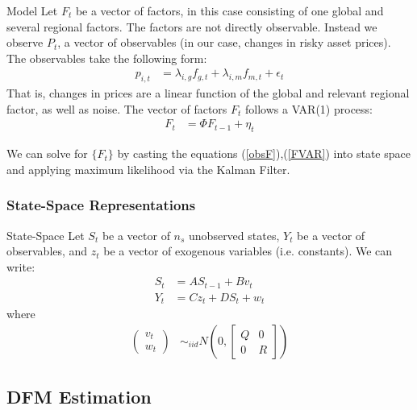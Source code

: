 \documentclass{beamer}
\begin{document}
\iffalse
\begin{frame}{Model}
Let $F_t$ be a vector of factors, in this case consisting of one global and several regional factors. The factors are not directly observable. Instead we observe $P_t$, a vector of observables (in our case, changes in risky asset prices). The observables take the following form:
\begin{align}
p_{i,t} &= \lambda_{i,g} f_{g,t} + \lambda_{i,m} f_{m,t} + \epsilon_t \label{obsF}
\end{align}
That is, changes in prices are a linear function of the global and relevant regional factor, as well as noise. The vector of factors $F_t$ follows a VAR(1) process:
\begin{align}
F_t &= \Phi F_{t-1} + \eta_t \label{FVAR}
\end{align}

We can solve for $\{F_t\}$ by casting the equations (\ref{obsF}),(\ref{FVAR}) into state space and applying maximum likelihood via the Kalman Filter.
\end{frame}
\subsubsection*{State-Space Representations}
\begin{frame}{State-Space}
Let $S_t$ be a vector of $n_s$ unobserved states, $Y_t$ be a vector of observables, and $z_t$ be a vector of exogenous variables (i.e. constants). We can write:
\begin{align}
S_t &= AS_{t-1} + B v_t\label{state} \tag{Transition}\\
Y_t &= C z_t + D S_{t} +  w_t\label{state} \tag{Measurement}
\end{align}
where
\begin{align*}
\begin{pmatrix} v_t \\ w_t \end{pmatrix} &\sim_{iid} N\left(0,\begin{bmatrix} Q & 0 \\ 0 & R \end{bmatrix} \right)
\end{align*}
\end{frame}

\subsection{DFM Estimation}
\end{document}
